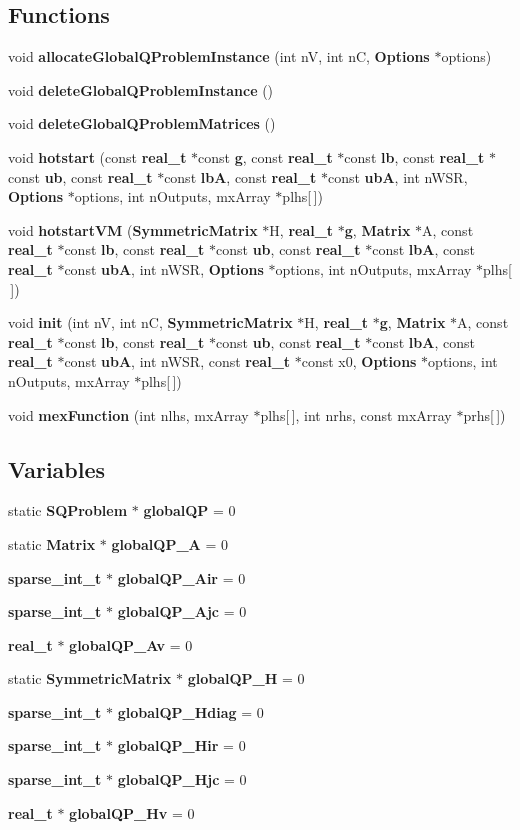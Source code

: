 \subsection*{Functions}
\begin{DoxyCompactItemize}
\item 
void {\bf allocateGlobalQProblemInstance} (int nV, int nC, {\bf Options} $\ast$options)
\item 
void {\bf deleteGlobalQProblemInstance} ()
\item 
void {\bf deleteGlobalQProblemMatrices} ()
\item 
void {\bf hotstart} (const {\bf real\_\-t} $\ast$const {\bf g}, const {\bf real\_\-t} $\ast$const {\bf lb}, const {\bf real\_\-t} $\ast$const {\bf ub}, const {\bf real\_\-t} $\ast$const {\bf lbA}, const {\bf real\_\-t} $\ast$const {\bf ubA}, int nWSR, {\bf Options} $\ast$options, int nOutputs, mxArray $\ast$plhs[$\,$])
\item 
void {\bf hotstartVM} ({\bf SymmetricMatrix} $\ast$H, {\bf real\_\-t} $\ast${\bf g}, {\bf Matrix} $\ast$A, const {\bf real\_\-t} $\ast$const {\bf lb}, const {\bf real\_\-t} $\ast$const {\bf ub}, const {\bf real\_\-t} $\ast$const {\bf lbA}, const {\bf real\_\-t} $\ast$const {\bf ubA}, int nWSR, {\bf Options} $\ast$options, int nOutputs, mxArray $\ast$plhs[$\,$])
\item 
void {\bf init} (int nV, int nC, {\bf SymmetricMatrix} $\ast$H, {\bf real\_\-t} $\ast${\bf g}, {\bf Matrix} $\ast$A, const {\bf real\_\-t} $\ast$const {\bf lb}, const {\bf real\_\-t} $\ast$const {\bf ub}, const {\bf real\_\-t} $\ast$const {\bf lbA}, const {\bf real\_\-t} $\ast$const {\bf ubA}, int nWSR, const {\bf real\_\-t} $\ast$const x0, {\bf Options} $\ast$options, int nOutputs, mxArray $\ast$plhs[$\,$])
\item 
void {\bf mexFunction} (int nlhs, mxArray $\ast$plhs[$\,$], int nrhs, const mxArray $\ast$prhs[$\,$])
\end{DoxyCompactItemize}
\subsection*{Variables}
\begin{DoxyCompactItemize}
\item 
static {\bf SQProblem} $\ast$ {\bf globalQP} = 0
\item 
static {\bf Matrix} $\ast$ {\bf globalQP\_\-A} = 0
\item 
{\bf sparse\_\-int\_\-t} $\ast$ {\bf globalQP\_\-Air} = 0
\item 
{\bf sparse\_\-int\_\-t} $\ast$ {\bf globalQP\_\-Ajc} = 0
\item 
{\bf real\_\-t} $\ast$ {\bf globalQP\_\-Av} = 0
\item 
static {\bf SymmetricMatrix} $\ast$ {\bf globalQP\_\-H} = 0
\item 
{\bf sparse\_\-int\_\-t} $\ast$ {\bf globalQP\_\-Hdiag} = 0
\item 
{\bf sparse\_\-int\_\-t} $\ast$ {\bf globalQP\_\-Hir} = 0
\item 
{\bf sparse\_\-int\_\-t} $\ast$ {\bf globalQP\_\-Hjc} = 0
\item 
{\bf real\_\-t} $\ast$ {\bf globalQP\_\-Hv} = 0
\end{DoxyCompactItemize}


